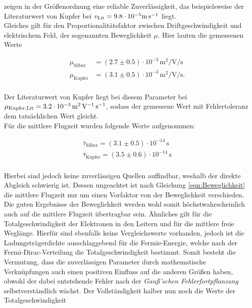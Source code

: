 \noindent zeigen in der Größenordnung eine reliable Zuverlässigkeit, das beispielsweise der Literaturwert von Kupfer bei 
$v_\text{Lit} = 9.8\cdot{}10^{-5}\unit[per-mode=reciprocal]{\meter\per\second}$ liegt.\\

\noindent Gleiches gilt für den Proportionalitätsfaktor zwischen Driftgeschwindigkeit und elektrischem Feld, der 
sogenannten Beweglichkeit $\mu$. Hier lauten die gemessenen Werte 

\begin{align*}
    \mu_\text{Silber} &= \left(2.7 \pm0.5\right)\cdot{}10^{-3}\,\unit{\square\meter\per\volt\per\second}\\
    \mu_\text{Kupfer} &= \left(3.1 \pm0.5\right)\cdot{}10^{-3}\,\unit{\square\meter\per\volt\per\second}.\\
\end{align*}

\noindent Der Literaturwert von Kupfer \cite[292]{Physikalisches_Praktikum} liegt bei diesem Parameter bei $\mu_\text{Kupfer,Lit} = 3.2
\cdot{}10^{-3}\,\unit[per-mode=reciprocal]{\square\meter\per\volt\per\second}$, sodass der gemessene Wert mit Fehlertoleranz dem tatsächlichen 
Wert gleicht.\\

\noindent Für die mittlere Flugzeit wurden folgende Werte aufgenommen:

\begin{align*}
    \bar{\tau}_\text{Silber} = \left(3.1\pm0.5\right)\cdot10^{-14}\,\unit{\second}\\
    \bar{\tau}_\text{Kupfer} = \left(3.5\pm0.6\right)\cdot10^{-14}\,\unit{\second}\\
\end{align*}

\noindent Hierbei sind jedoch keine zuverlässigen Quellen auffindbar, weshalb der direkte Abgleich schwierig ist. 
Dessen ungeachtet ist nach Gleichung \eqref{eqn:Beweglichkeit} die mittlere Flugzeit nur um einen Vorfaktor von der 
Beweglichkeit verschieden. Die guten Ergebnisse der Beweglichkeit werden wohl somit höchstwahrscheinlich auch auf die 
mittlere Flugzeit übertragbar sein. Ähnliches gilt für die Totalgeschwindigkeit der Elektronen in den Leitern und für 
die mittlere freie Weglänge. Hierfür sind ebenfalls keine Vergleichswerte vorhanden, jedoch ist die Ladungsträgerdichte 
ausschlaggebend für die Fermie-Energie, welche nach der Fermi-Dirac-Verteilung die Totalgeschwindigkeit bestimmt. Somit 
besteht die Vermutung, dass die zuverlässigen Parameter durch mathematische Verknüpfungen auch einen positiven Einfluss 
auf die anderen Größen haben, obwohl der dabei entstehende Fehler nach der \emph{Gauß'schen Fehlerfortpflanzung} 
selbstverständlich wächst. Der Vollständigkeit halber nun noch die Werte der Totalgeschwindigkeit

